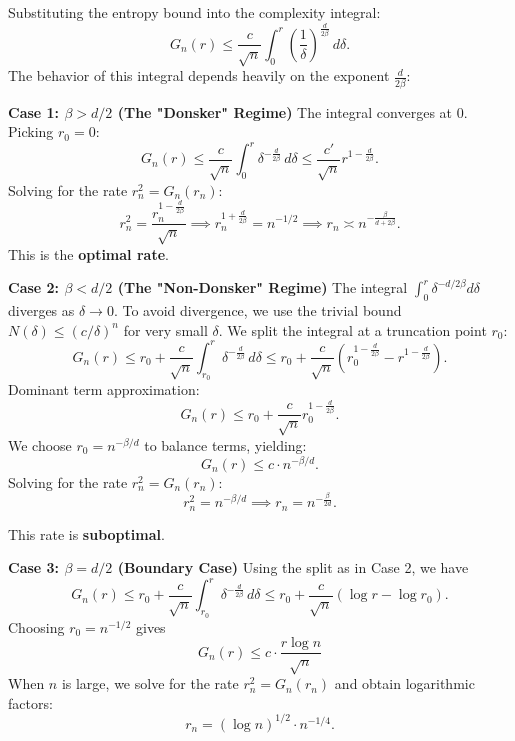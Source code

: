 \begin{remark}
    Substituting the entropy bound into the complexity integral:
\[
G_n(r) \leq \frac{c}{\sqrt{n}} \int_0^r \left( \frac{1}{\delta} \right)^{\frac{d}{2\beta}} \, d\delta.
\]
The behavior of this integral depends heavily on the exponent $\frac{d}{2\beta}$:

    \textbf{Case 1: $\beta > d/2$ (The "Donsker" Regime)}
The integral converges at 0. Picking $r_0 = 0$:
\[
G_n(r) \leq \frac{c}{\sqrt{n}} \int_0^r \delta^{-\frac{d}{2\beta}} \, d\delta \leq \frac{c'}{\sqrt{n}} r^{1 - \frac{d}{2\beta}}.
\]
Solving for the rate $r_n^2 = G_n(r_n)$:
\[
r_n^2 = \frac{r_n^{1 - \frac{d}{2\beta}}}{\sqrt{n}} \implies r_n^{1 + \frac{d}{2\beta}} = n^{-1/2} \implies r_n \asymp n^{-\frac{\beta}{d+2\beta}}.
\]
This is the \textbf{optimal rate}.

\textbf{Case 2: $\beta < d/2$ (The "Non-Donsker" Regime)}
The integral $\int_0^r \delta^{-d/2\beta} d\delta$ diverges as $\delta \to 0$. To avoid divergence, we use the trivial bound $N(\delta) \leq (c/\delta)^n$ for very small $\delta$. We split the integral at a truncation point $r_0$:
\[
G_n(r) \leq r_0 + \frac{c}{\sqrt{n}} \int_{r_0}^r \delta^{-\frac{d}{2\beta}} \, d\delta \leq r_0 + \frac{c}{\sqrt{n}} \left( r_0^{1-\frac{d}{2\beta}} - r^{1-\frac{d}{2\beta}} \right).
\]
Dominant term approximation:
\[
G_n(r) \leq r_0 + \frac{c}{\sqrt{n}} r_0^{1 - \frac{d}{2\beta}}.
\]
We choose $r_0 = n^{-\beta/d}$ to balance terms, yielding:
\[
G_n(r) \leq c \cdot n^{-\beta/d}.
\]
Solving for the rate $r_n^2 = G_n(r_n)$:
\[
r_n^2 = n^{-\beta/d} \implies r_n = n^{-\frac{\beta}{2d}}.
\]
\begin{remark}
    This rate is \textbf{suboptimal}. 
\end{remark}
\textbf{Case 3: $\beta = d/2$ (Boundary Case)} Using the split as in Case 2, we have
\[
G_n(r) \leq r_0 + \frac{c}{\sqrt{n}} \int_{r_0}^r \delta^{-\frac{d}{2\beta}} \, d\delta \leq r_0 + \frac{c}{\sqrt{n}} \left( \log r-\log r_0 \right).
\]
Choosing $r_0=n^{-1/2}$ gives 
\[
G_n(r)\le c\cdot \frac{r\log n}{\sqrt{n}}
\]
When $n$ is large, we solve for the rate $r_n^2 = G_n(r_n)$ and obtain logarithmic factors:
\[
r_n = (\log n)^{1/2} \cdot n^{-1/4}.
\]
\end{remark}



